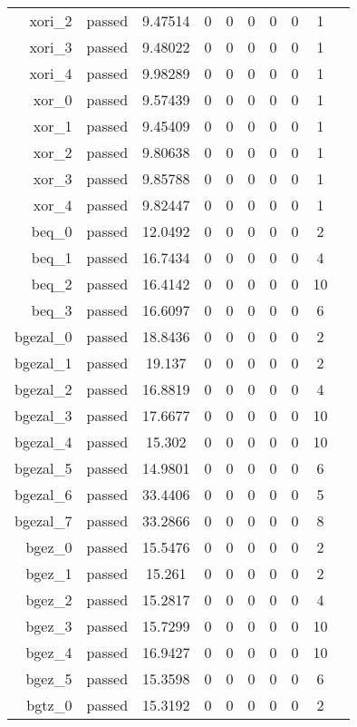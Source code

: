 \begin{longtable}{r|ccccccccc}
    xori\_2 & passed & 9.47514 & 0 & 0 & 0 & 0 & 0 & 1 \\
    xori\_3 & passed & 9.48022 & 0 & 0 & 0 & 0 & 0 & 1 \\
    xori\_4 & passed & 9.98289 & 0 & 0 & 0 & 0 & 0 & 1 \\
    xor\_0 & passed & 9.57439 & 0 & 0 & 0 & 0 & 0 & 1 \\
    xor\_1 & passed & 9.45409 & 0 & 0 & 0 & 0 & 0 & 1 \\
    xor\_2 & passed & 9.80638 & 0 & 0 & 0 & 0 & 0 & 1 \\
    xor\_3 & passed & 9.85788 & 0 & 0 & 0 & 0 & 0 & 1 \\
    xor\_4 & passed & 9.82447 & 0 & 0 & 0 & 0 & 0 & 1 \\
    beq\_0 & passed & 12.0492 & 0 & 0 & 0 & 0 & 0 & 2 \\
    beq\_1 & passed & 16.7434 & 0 & 0 & 0 & 0 & 0 & 4 \\
    beq\_2 & passed & 16.4142 & 0 & 0 & 0 & 0 & 0 & 10 \\
    beq\_3 & passed & 16.6097 & 0 & 0 & 0 & 0 & 0 & 6 \\
    bgezal\_0 & passed & 18.8436 & 0 & 0 & 0 & 0 & 0 & 2 \\
    bgezal\_1 & passed & 19.137 & 0 & 0 & 0 & 0 & 0 & 2 \\
    bgezal\_2 & passed & 16.8819 & 0 & 0 & 0 & 0 & 0 & 4 \\
    bgezal\_3 & passed & 17.6677 & 0 & 0 & 0 & 0 & 0 & 10 \\
    bgezal\_4 & passed & 15.302 & 0 & 0 & 0 & 0 & 0 & 10 \\
    bgezal\_5 & passed & 14.9801 & 0 & 0 & 0 & 0 & 0 & 6 \\
    bgezal\_6 & passed & 33.4406 & 0 & 0 & 0 & 0 & 0 & 5 \\
    bgezal\_7 & passed & 33.2866 & 0 & 0 & 0 & 0 & 0 & 8 \\
    bgez\_0 & passed & 15.5476 & 0 & 0 & 0 & 0 & 0 & 2 \\
    bgez\_1 & passed & 15.261 & 0 & 0 & 0 & 0 & 0 & 2 \\
    bgez\_2 & passed & 15.2817 & 0 & 0 & 0 & 0 & 0 & 4 \\
    bgez\_3 & passed & 15.7299 & 0 & 0 & 0 & 0 & 0 & 10 \\
    bgez\_4 & passed & 16.9427 & 0 & 0 & 0 & 0 & 0 & 10 \\
    bgez\_5 & passed & 15.3598 & 0 & 0 & 0 & 0 & 0 & 6 \\
    bgtz\_0 & passed & 15.3192 & 0 & 0 & 0 & 0 & 0 & 2 \\

\end{longtable}
